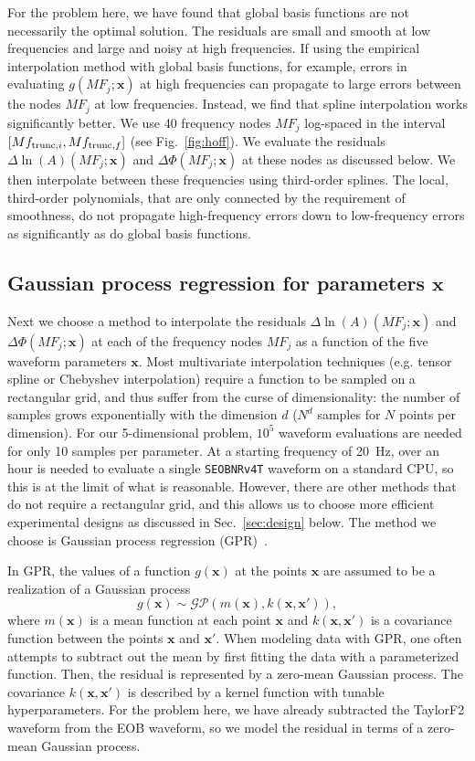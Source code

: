\documentclass[prd,aps,letter,twocolumn,floatfix,notitlepage,nofootinbib]{revtex4-1}
\def\bx{\mathbf{x}}
\begin{document}
For the problem here, we have found that global basis functions are not necessarily the optimal solution. The residuals are small and smooth at low frequencies and large and noisy at high frequencies. If using the empirical interpolation method with global basis functions, for example, errors in evaluating $g(MF_j;\bx)$ at high frequencies can propagate to large errors between the nodes $MF_j$ at low frequencies. Instead, we find that spline interpolation works significantly better. We use 40 frequency nodes $MF_j$ log-spaced in the interval $[Mf_{{\rm trunc}, i}, Mf_{{\rm trunc}, f}]$ (see Fig.~\ref{fig:hoff}). We evaluate the residuals $\Delta\ln(A)(MF_j; \bx)$ and $\Delta\Phi(MF_j; \bx)$ at these nodes as discussed below. We then interpolate between these frequencies using third-order splines. The local, third-order polynomials, that are only connected by the requirement of smoothness, do not propagate high-frequency errors down to low-frequency errors as significantly as do global basis functions.


\subsection{Gaussian process regression for parameters $\bx$}

Next we choose a method to interpolate the residuals $\Delta\ln(A)(MF_j; \bx)$ and $\Delta\Phi(MF_j; \bx)$ at each of the frequency nodes $MF_j$ as a function of the five waveform parameters $\bx$. Most multivariate interpolation techniques (e.g. tensor spline or Chebyshev interpolation) require a function to be sampled on a rectangular grid, and thus suffer from the curse of dimensionality: the number of samples grows exponentially with the dimension $d$ ($N^d$ samples for $N$ points per dimension). For our 5-dimensional problem, $10^5$ waveform evaluations are needed for only 10 samples per parameter. At a starting frequency of 20~Hz, over an hour is needed to evaluate a single \texttt{SEOBNRv4T} waveform on a standard CPU, so this is at the limit of what is reasonable. However, there are other methods that do not require a rectangular grid, and this allows us to choose more efficient experimental designs as discussed in Sec.~\ref{sec:design} below. The method we choose is Gaussian process regression (GPR)~\cite{RasmussenWilliams2006}.

In GPR, the values of a function $g(\bx)$ at the points $\bx$ are assumed to be a realization of a Gaussian process
\begin{equation}
g(\bx) \sim \mathcal{GP}(m(\bx), k(\bx, \bx')),
\end{equation}
where $m(\bx)$ is a mean function at each point $\bx$ and $k(\bx, \bx')$ is a covariance function between the points $\bx$ and $\bx'$.
When modeling data with GPR, one often attempts to subtract out the mean by first fitting the data with a parameterized function. Then, the residual is represented by a zero-mean Gaussian process. The covariance $k(\bx, \bx')$ is described by a kernel function with tunable hyperparameters. For the problem here, we have already subtracted the TaylorF2 waveform from the EOB waveform, so we model the residual in terms of a zero-mean Gaussian process. 
\end{document}
